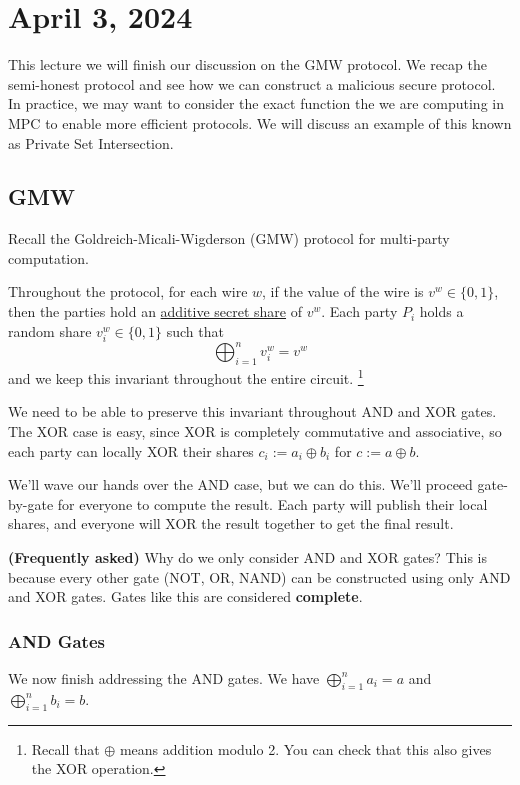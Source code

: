 \section{April 3, 2024}
\label{20240403}

This lecture we will finish our discussion on the GMW protocol. We recap the semi-honest protocol and see how we can construct a malicious secure protocol. In practice, we may want to consider the exact function the we are computing in MPC to enable more efficient protocols. We will discuss an example of this known as Private Set Intersection.

\subsection{GMW}

Recall the Goldreich-Micali-Wigderson (GMW) protocol for multi-party computation.

Throughout the protocol, for each wire $w$, if the value of the wire is $v^w \in\{0, 1\}$, then the parties hold an \ul{additive secret share} of $v^w$. Each party $P_i$ holds a random share $v_i^w\in\{0,1\}$ such that
\[\bigoplus_{i=1}^n v_i^w = v^w\]
and we keep this invariant throughout the entire circuit. \footnote{Recall that $\oplus$ means addition modulo 2. You can check that this also gives the XOR operation.}

We need to be able to preserve this invariant throughout \textsf{AND} and \textsf{XOR} gates. The \textsf{XOR} case is easy, since \textsf{XOR} is completely commutative and associative, so each party can locally \textsf{XOR} their shares $c_i := a_i\oplus b_i$ for $c := a\oplus b$.

We'll wave our hands over the \textsf{AND} case, but we can do this. We'll proceed gate-by-gate for everyone to compute the result. Each party will publish their local shares, and everyone will \textsf{XOR} the result together to get the final result.

\begin{remark}
    \textbf{(Frequently asked)} Why do we only consider AND and XOR gates? This is because every other gate (NOT, OR, NAND) can be constructed using only AND and XOR gates. Gates like this are considered \textbf{complete}.
\end{remark}

\subsubsection{AND Gates}
We now finish addressing the \textsf{AND} gates. We have $\bigoplus^n_{i=1}a_i = a$ and $\bigoplus^n_{i=1}b_i = b$.

